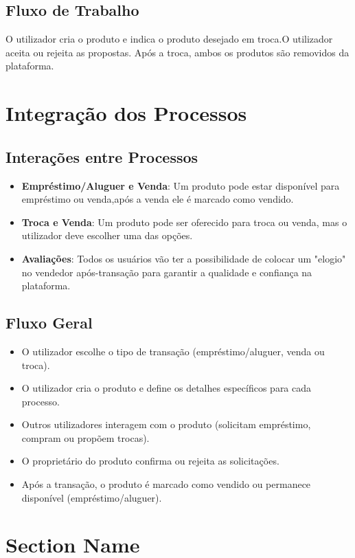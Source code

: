 \documentclass[a4paper, 12pt]{article} %
\begin{document}
\subsection{Fluxo de Trabalho}
O utilizador cria o produto e indica o produto desejado em troca.O utilizador aceita ou rejeita as propostas. Após a troca, ambos os produtos são removidos da plataforma.

\section{Integração dos Processos}

\subsection{Interações entre Processos}
\begin{itemize}
    \item \textbf{Empréstimo/Aluguer e Venda}: Um produto pode estar disponível para empréstimo ou venda,após a venda ele é marcado como vendido.
    \item \textbf{Troca e Venda}: Um produto pode ser oferecido para troca ou venda, mas o utilizador deve escolher uma das opções.
    \item \textbf{Avaliações}: Todos os usuários vão ter a possibilidade de colocar um "elogio" no vendedor após-transação para garantir a qualidade e confiança na plataforma. 
\end{itemize}

\subsection{Fluxo Geral}
\begin{itemize}
    \item O utilizador escolhe o tipo de transação (empréstimo/aluguer, venda ou troca).
    \item O utilizador cria o produto e define os detalhes específicos para cada processo.
    \item Outros utilizadores interagem com o produto (solicitam empréstimo, compram ou propõem trocas).
    \item O proprietário do produto confirma ou rejeita as solicitações.
    \item Após a transação, o produto é marcado como vendido ou permanece disponível (empréstimo/aluguer).
\end{itemize}

\section*{Section Name}
\end{document}
